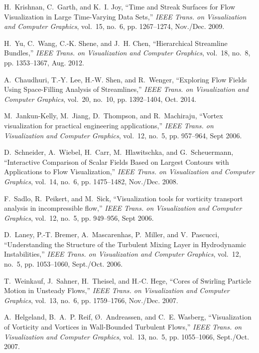\documentclass[10pt,journal,compsoc,twoside]{IEEEtran}
\begin{document}
\begin{thebibliography}{10}
		H.~Krishnan, C.~Garth, and K.~I. Joy, ``{Time and Streak Surfaces for Flow
			Visualization in Large Time-Varying Data Sets},'' \emph{IEEE Trans. on
			Visualization and Computer Graphics}, vol.~15, no.~6, pp. 1267--1274,
		Nov./Dec. 2009.
		
		H.~Yu, C.~Wang, C.-K. Shene, and J.~H. Chen, ``{Hierarchical Streamline
			Bundles},'' \emph{IEEE Trans. on Visualization and Computer Graphics},
		vol.~18, no.~8, pp. 1353--1367, Aug. 2012.
		
		A.~Chaudhuri, T.-Y. Lee, H.-W. Shen, and R.~Wenger, ``{Exploring Flow Fields
			Using Space-Filling Analysis of Streamlines},'' \emph{IEEE Trans. on
			Visualization and Computer Graphics}, vol.~20, no.~10, pp. 1392--1404, Oct.
		2014.
		
		M.~Jankun-Kelly, M.~Jiang, D.~Thompson, and R.~Machiraju, ``Vortex
		visualization for practical engineering applications,'' \emph{IEEE Trans. on Visualization
			and Computer Graphics}, vol.~12, no.~5, pp. 957--964,
		Sept 2006.
		
		D.~Schneider, A.~Wiebel, H.~Carr, M.~Hlawitschka, and G.~Scheuermann,
		``{Interactive Comparison of Scalar Fields Based on Largest Contours with
			Applications to Flow Visualization},'' \emph{IEEE Trans. on
			Visualization and Computer Graphics}, vol.~14, no.~6, pp. 1475--1482,
		Nov./Dec. 2008.
		
		F.~Sadlo, R.~Peikert, and M.~Sick, ``Visualization tools for vorticity
		transport analysis in incompressible flow,'' \emph{IEEE Trans. on Visualization and Computer
			Graphics}, vol.~12, no.~5, pp. 949--956, Sept 2006.
		
		D.~Laney, P.-T. Bremer, A.~Mascarenhas, P.~Miller, and V.~Pascucci,
		``{Understanding the Structure of the Turbulent Mixing Layer in Hydrodynamic
			Instabilities},'' \emph{IEEE Trans. on Visualization and Computer
			Graphics}, vol.~12, no.~5, pp. 1053--1060, Sept./Oct. 2006.
		
		T.~Weinkauf, J.~Sahner, H.~Theisel, and H.-C. Hege, ``{Cores of Swirling
			Particle Motion in Unsteady Flows},'' \emph{IEEE Trans. on
			Visualization and Computer Graphics}, vol.~13, no.~6, pp. 1759--1766,
		Nov./Dec. 2007.
		
		A.~Helgeland, B.~A.~P. Reif, {\O}.~Andreassen, and C.~E. Wasberg,
		``{Visualization of Vorticity and Vortices in Wall-Bounded Turbulent
			Flows},'' \emph{IEEE Trans. on Visualization and Computer Graphics},
		vol.~13, no.~5, pp. 1055--1066, Sept./Oct. 2007.
		

\end{thebibliography}
\end{document}
